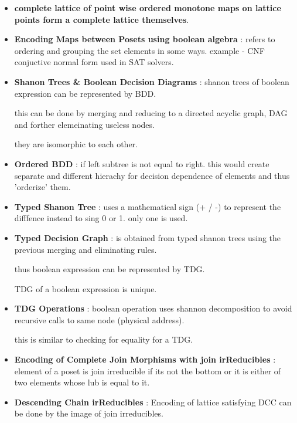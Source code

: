 \begin{itemize}
	\item{\textbf{complete lattice of point wise ordered monotone maps on lattice points form a complete lattice themselves}. 
	}

	\item{\textbf{Encoding Maps between Posets using boolean algebra} : refers to ordering and grouping the set elements in some ways. example - CNF conjuctive normal form used in SAT solvers. 
	}

	\item{\textbf{Shanon Trees \& Boolean Decision Diagrams} : shanon trees of boolean expression can be represented by BDD.

	this can be done by merging and reducing to a directed acyclic graph, DAG and forther elemeinating useless nodes.

	they are isomorphic to each other.
	}

	\item{\textbf{Ordered BDD } : if left subtree is not equal to right. this would create separate and different hierachy for decision dependence of elements and thus 'orderize' them.
	}

	\item{\textbf{Typed Shanon Tree} : uses a mathematical sign (+ / -) to represent the difffence instead to sing 0 or 1. only one is used.
	}

	\item{\textbf{Typed Decision Graph} : is obtained from typed shanon trees using the previous merging and eliminating rules.

	thus boolean expression can be represented by TDG.

	TDG  of a boolean expression is unique.
	}

	\item{\textbf{TDG Operations} : boolean operation uses shannon decomposition to avoid recursive calls to same node (physical address). 

	this is similar to checking for equality for a TDG.
	}

	\item{\textbf{Encoding of Complete Join Morphisms with join irReducibles} :
	element of a poset is join irreducible if its not the bottom or it is either of two elements whose lub is equal to it.
	}

	\item{\textbf{Descending Chain irReducibles} :
	Encoding of lattice satisfying DCC can be done by the image of join irreducibles.
	}


\end{itemize}
